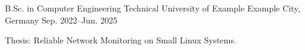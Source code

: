 
\begin{cventries}
  \cventry
    {B.Sc. in Computer Engineering}
    {Technical University of Example}
    {Example City, Germany}
    {Sep. 2022--Jun. 2025}
    {
      \begin{cvitems}
        \item {Thesis: Reliable Network Monitoring on Small Linux Systems.}
      \end{cvitems}
    }
\end{cventries}
